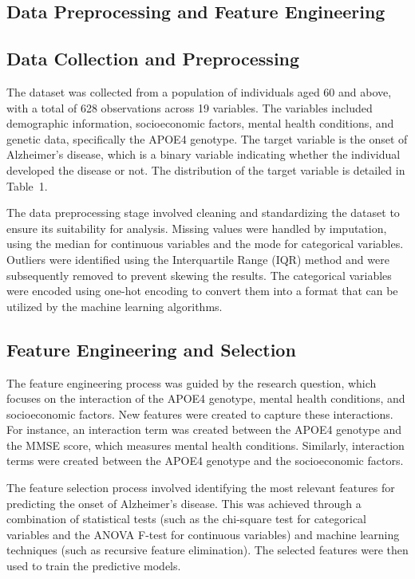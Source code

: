 \documentclass[conference]{IEEEtran}
\begin{document}
\subsection{Data Preprocessing and Feature Engineering}
\subsection{Data Collection and Preprocessing}
The dataset was collected from a population of individuals aged 60 and above, with a total of 628 observations across 19 variables. The variables included demographic information, socioeconomic factors, mental health conditions, and genetic data, specifically the APOE4 genotype. The target variable is the onset of Alzheimer's disease, which is a binary variable indicating whether the individual developed the disease or not. The distribution of the target variable is detailed in Table~1.

The data preprocessing stage involved cleaning and standardizing the dataset to ensure its suitability for analysis. Missing values were handled by imputation, using the median for continuous variables and the mode for categorical variables. Outliers were identified using the Interquartile Range (IQR) method and were subsequently removed to prevent skewing the results. The categorical variables were encoded using one-hot encoding to convert them into a format that can be utilized by the machine learning algorithms. 

\subsection{Feature Engineering and Selection}
The feature engineering process was guided by the research question, which focuses on the interaction of the APOE4 genotype, mental health conditions, and socioeconomic factors. New features were created to capture these interactions. For instance, an interaction term was created between the APOE4 genotype and the MMSE score, which measures mental health conditions. Similarly, interaction terms were created between the APOE4 genotype and the socioeconomic factors.

The feature selection process involved identifying the most relevant features for predicting the onset of Alzheimer's disease. This was achieved through a combination of statistical tests (such as the chi-square test for categorical variables and the ANOVA F-test for continuous variables) and machine learning techniques (such as recursive feature elimination). The selected features were then used to train the predictive models.
\end{document}
